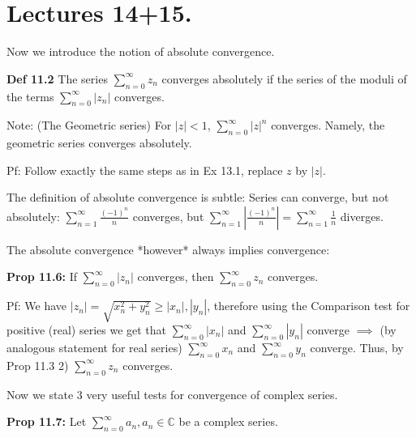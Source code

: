 \documentclass{article}
\begin{document}
\section*{Lectures 14+15.}

Now we introduce the notion of absolute convergence.

\textbf{Def 11.2} The series $\sum_{n=0}^{\infty} z_n$ converges absolutely if the series of the moduli of the terms $\sum_{n=0}^{\infty} |z_n|$ converges.

Note: (The Geometric series) For $|z| < 1$, $\sum_{n=0}^{\infty} |z|^n$ converges. Namely, the geometric series converges absolutely.

Pf: Follow exactly the same steps as in Ex 13.1, replace $z$ by $|z|$.

The definition of absolute convergence is subtle: Series can converge, but not absolutely: $\sum_{n=1}^{\infty} \frac{(-1)^n}{n}$ converges, but $\sum_{n=1}^{\infty} |\frac{(-1)^n}{n}| = \sum_{n=1}^{\infty} \frac{1}{n}$ diverges.

The absolute convergence *however* always implies convergence:

\textbf{Prop 11.6:} If $\sum_{n=0}^{\infty} |z_n|$ converges, then $\sum_{n=0}^{\infty} z_n$ converges.

Pf: We have $|z_n| = \sqrt{x_n^2 + y_n^2} \geq |x_n|, |y_n|$, therefore using the Comparison test for positive (real) series we get that $\sum_{n=0}^{\infty} |x_n|$ and $\sum_{n=0}^{\infty} |y_n|$ converge $\implies$ (by analogous statement for real series) $\sum_{n=0}^{\infty} x_n$ and $\sum_{n=0}^{\infty} y_n$ converge. Thus, by Prop 11.3 2) $\sum_{n=0}^{\infty} z_n$ converges.

Now we state 3 very useful tests for convergence of complex series.

\textbf{Prop 11.7:} Let $\sum_{n=0}^{\infty} a_n, a_n \in \mathbb{C}$ be a complex series.
\end{document}
